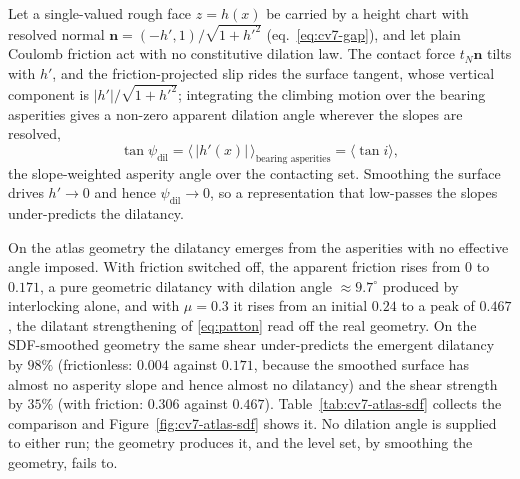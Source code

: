 \documentclass{svjour3}                 %
\newcommand{\abs}[1]{\lvert#1\rvert}
\newcommand{\nbf}{\bm{n}}
\begin{document}
\begin{remark}\label{prop:dilatancy}
Let a single-valued rough face $z=h(x)$ be carried by a height chart with resolved normal
$\nbf=(-h',1)/\sqrt{1+h'^2}$ (eq.~\eqref{eq:cv7-gap}), and let plain Coulomb friction act with no constitutive
dilation law. The contact force $t_N\nbf$ tilts with $h'$, and the friction-projected slip rides the surface
tangent, whose vertical component is $\abs{h'}/\sqrt{1+h'^2}$; integrating the climbing motion over the
bearing asperities gives a non-zero apparent dilation angle wherever the slopes are resolved,
\begin{equation}\label{eq:emergent-dilatancy}
\tan\psi_{\mathrm{dil}}=\big\langle\,\abs{h'(x)}\,\big\rangle_{\text{bearing asperities}}=\langle\tan i\rangle,
\end{equation}
the slope-weighted asperity angle over the contacting set. Smoothing the surface drives $h'\to0$ and hence
$\psi_{\mathrm{dil}}\to0$, so a representation that low-passes the slopes under-predicts the dilatancy.
\end{remark}

On the atlas geometry the dilatancy emerges from the asperities with no effective angle imposed. With friction switched off, the apparent friction rises from $0$ to $0.171$, a pure geometric dilatancy with dilation angle $\approx9.7^\circ$ produced by interlocking alone, and with $\mu=0.3$ it rises from an initial $0.24$ to a peak of $0.467$, the dilatant strengthening of \eqref{eq:patton} read off the real geometry. On the SDF-smoothed geometry the same shear under-predicts the emergent dilatancy by $98\%$ (frictionless: $0.004$ against $0.171$, because the smoothed surface has almost no asperity slope and hence almost no dilatancy) and the shear strength by $35\%$ (with friction: $0.306$ against $0.467$). Table~\ref{tab:cv7-atlas-sdf} collects the comparison and Figure~\ref{fig:cv7-atlas-sdf} shows it. No dilation angle is supplied to either run; the geometry produces it, and the level set, by smoothing the geometry, fails to.
\end{document}
